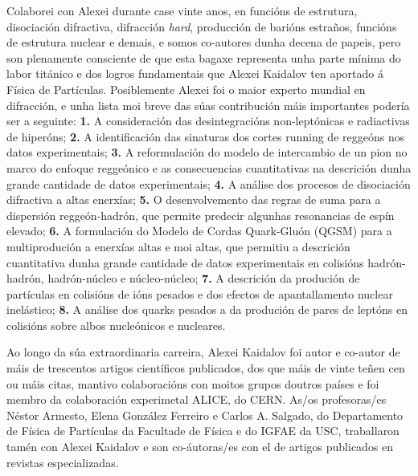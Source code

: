 \begin{refsection}
\begin{multicols}{2}
Colaborei con Alexei durante case vinte anos, en funcións de estrutura, disociación difractiva, difracción \textit{hard}, producción de barións estraños, funcións de estrutura nuclear e demais, e somos co-autores dunha decena de papeis, pero son plenamente consciente de que esta bagaxe representa unha parte mínima do labor titánico e dos logros fundamentais que Alexei Kaidalov ten aportado á Física de Partículas. Posiblemente Alexei foi o maior experto mundial en difracción, e unha lista moi breve das súas contribución máis importantes podería ser a seguinte: \textbf{1.} A consideración das desintegracións non-leptónicas e radiactivas de hiperóns; \textbf{2.} A identificación das sinaturas dos cortes running de reggeóns nos datos experimentais; \textbf{3.} A reformulación do modelo de intercambio de un pion no marco do enfoque reggeónico e as consecuencias cuantitativas na descrición dunha grande cantidade de datos experimentais; \textbf{4.} A análise dos procesos de disociación difractiva a altas enerxías; \textbf{5.} O desenvolvemento das regras de suma para a dispersión reggeón-hadrón, que permite predecir algunhas resonancias de espín elevado; \textbf{6.} A formulación do Modelo de Cordas Quark-Gluón (QGSM) para a multiprodución a enerxías altas e moi altas, que permitiu a descrición cuantitativa dunha grande cantidade de datos experimentais en colisións hadrón-hadrón, hadrón-núcleo e núcleo-núcleo; \textbf{7.} A descrición da produción de partículas en colisións de ións pesados e dos efectos de apantallamento nuclear inelástico; \textbf{8.} A análise dos quarks pesados a da produción de pares de leptóns en colisións sobre albos nucleónicos e nucleares.

Ao longo da súa extraordinaria carreira, Alexei Kaidalov foi autor e co-autor de máis de trescentos artigos científicos publicados, dos que máis de vinte teñen cen ou máis citas, mantivo colaboracións con moitos grupos doutros países e foi membro da colaboración experimetal ALICE, do CERN. As/os profesoras/es Néstor Armesto, Elena González Ferreiro e Carlos A. Salgado, do Departamento de Física de Partículas da Facultade de Física e do IGFAE da USC, traballaron tamén con Alexei Kaidalov e son co-áutoras/es con el de artigos publicados en revistas especializadas.


\end{multicols}
\end{refsection}

